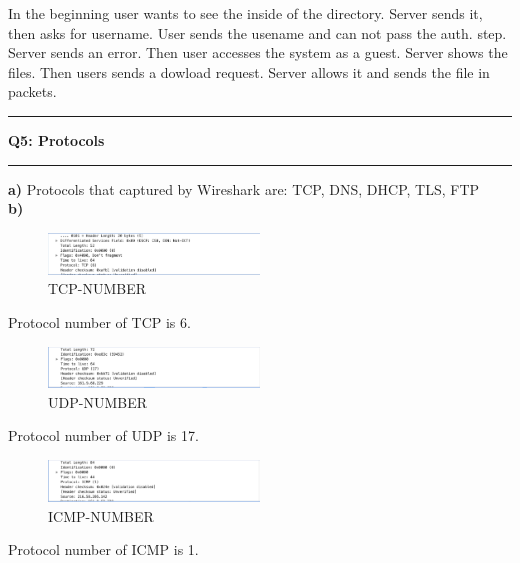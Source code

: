 \documentclass[11pt]{article}
\newcommand\question[2]{\vspace{.25in}\hrule\textbf{#1: #2}\vspace{.5em}\hrule\vspace{.10in}}
\renewcommand\part[1]{\vspace{.10in}\textbf{#1}}
\begin{document}
	In the beginning user wants to see the inside of the directory. Server sends it, then asks for username. User sends the usename and can not pass the auth. step. Server sends an error. Then user accesses the system as a guest. Server shows the files. Then users sends a dowload request. Server allows it and sends the file in packets.
	
	\question{Q5}{Protocols}
	\part{a)} Protocols that captured by Wireshark are: TCP, DNS, DHCP, TLS, FTP\\
	\part{b)}
	\begin{figure}[H]
		\centering
		\includegraphics[width=0.5\textwidth]{images/tcp-number.png}
		\caption{TCP-NUMBER}
		\label{fig:TCP-NUMBER}
	\end{figure}

	Protocol number of TCP is 6.
	
	\begin{figure}[H]
		\centering
		\includegraphics[width=0.5\textwidth]{images/udp-number.png}
		\caption{UDP-NUMBER}
		\label{fig:UDP-NUMBER}
	\end{figure}
	
	Protocol number of UDP is 17.
	
	\begin{figure}[H]
		\centering
		\includegraphics[width=0.5\textwidth]{images/icmp-number.png}
		\caption{ICMP-NUMBER}
		\label{fig:ICMP-NUMBER}
	\end{figure}
	
	Protocol number of ICMP is 1.
\end{document}
